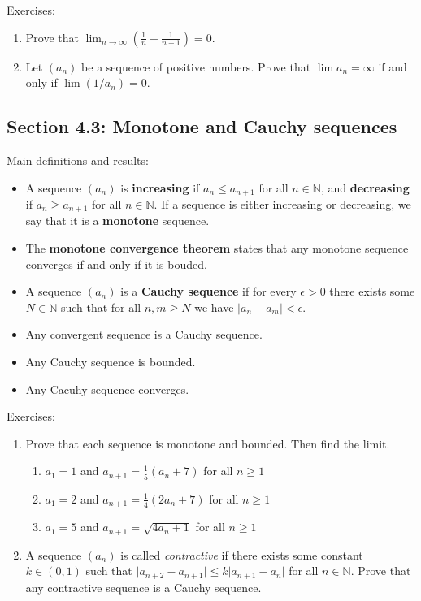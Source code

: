 \documentclass[letterpaper,12pt]{article}
\newcommand{\N}{\mathbb{N}}
\newcommand{\abs}[1]{\lvert #1\rvert}
\begin{document}
\noindent Exercises:
\begin{enumerate}
 \item Prove that $\displaystyle \lim_{n\to\infty}\left(\frac{1}{n}-\frac{1}{n+1}\right)=0$.
 \item Let $(a_n)$ be a sequence of positive numbers. Prove that $\lim a_n = \infty$ if and only if $\lim (1/a_n) = 0$.
\end{enumerate}
\subsection*{Section 4.3: Monotone and Cauchy sequences}
Main definitions and results:
\begin{itemize}
 \item A sequence $(a_n)$ is {\bf increasing} if $a_n\leq a_{n+1}$ for all $n\in\N$, and {\bf decreasing} if $a_n\geq a_{n+1}$ for all $n\in\N$. If a sequence is either increasing or decreasing, we say that it is a {\bf monotone} sequence.
 \item The {\bf monotone convergence theorem} states that any monotone sequence converges if and only if it is bouded.
 \item A sequence $(a_n)$ is a {\bf Cauchy sequence} if for every $\epsilon>0$ there exists some $N\in\N$ such that for all $n,m\geq N$ we have $\abs{a_n-a_m}<\epsilon$.
 \item Any convergent sequence is a Cauchy sequence.
 \item Any Cauchy sequence is bounded.
 \item Any Cacuhy sequence converges.
\end{itemize}

\noindent Exercises:
\begin{enumerate}
 \item Prove that each sequence is monotone and bounded. Then find the limit.
\begin{enumerate}
 \item $a_1=1$ and $a_{n+1} = \frac{1}{5}(a_n+7)$ for all $n\geq 1$
 \item $a_1=2$ and $a_{n+1} = \frac{1}{4}(2a_n+7)$ for all $n\geq 1$
 \item $a_1=5$ and $a_{n+1} = \sqrt{4a_n+1}$ for all $n\geq 1$
\end{enumerate}
 \item A sequence $(a_n)$ is called {\em contractive} if there exists some constant $k\in (0,1)$ such that $\abs{a_{n+2}-a_{n+1}}\leq k\abs{a_{n+1}-a_n}$ for all $n\in\N$. Prove that any contractive sequence is a Cauchy sequence.
\end{enumerate}








 
\end{document}

